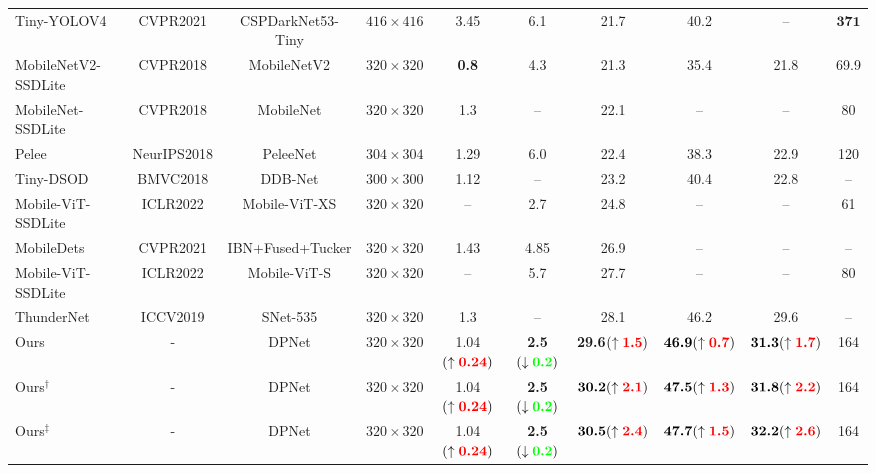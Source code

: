 \documentclass[lettersize,journal]{IEEEtran}
\begin{document}
\begin{table*}[t!]
\begin{center}
\begin{tabular}{l|c|c|c|c|c|c|c|c|c}
Tiny-YOLOV4 \cite{wang2021scaled} &CVPR2021& CSPDarkNet53-Tiny &$416\times416$&3.45 & 6.1 &21.7&40.2&--& $\textbf{371}$\\ 		
			MobileNetV2-SSDLite \cite{sandler2018mobilenetv2}  &CVPR2018 & MobileNetV2 &$320\times320$& \textbf{0.8} & 4.3 &21.3&35.4&21.8&69.9\\
			MobileNet-SSDLite \cite{sandler2018mobilenetv2}  &CVPR2018 & MobileNet &$320\times320$& 1.3 & -- &22.1&--&--&80\\
			Pelee \cite{Pelee} &NeurIPS2018 &PeleeNet&$304\times304$  &1.29 & 6.0 &22.4&38.3&22.9 &120\\
			Tiny-DSOD \cite{li2018tiny}&BMVC2018 &DDB-Net&$300\times300$  &1.12 & -- &23.2&40.4&22.8 & --\\
Mobile-ViT-SSDLite \cite{mehta2021mobilevit}&ICLR2022 &Mobile-ViT-XS &$320\times320$ &--&2.7 &24.8&--&--&61\\
			MobileDets \cite{xiong2021mobiledets}&CVPR2021 & IBN+Fused+Tucker  &$320\times320$&1.43 & 4.85 &26.9&--&-- &-- \\
			Mobile-ViT-SSDLite \cite{mehta2021mobilevit}&ICLR2022	 &Mobile-ViT-S &$320\times320$  &--&5.7&27.7&--&--&80\\
			ThunderNet \cite{qin2019thundernet}&ICCV2019&SNet-535&$320\times320$&1.3 & -- &28.1 &46.2&29.6 & --\\			
\midrule
			Ours &- &DPNet&$320\times320$&1.04$(\uparrow\textcolor{red}{\textbf{0.24}})$ & \textbf{2.5}$(\downarrow\textcolor{green}{\textbf{0.2}})$ &  \textbf{29.6}$(\uparrow\textcolor{red}{\textbf{1.5}})$ &$\textbf{46.9}(\uparrow\textcolor{red}{\textbf{0.7}})$  &$\textbf{31.3}(\uparrow\textcolor{red}{\textbf{1.7}})$ & 164\\
			Ours$^{\dagger}$ &- &DPNet&$320\times320$&1.04$(\uparrow\textcolor{red}{\textbf{0.24}})$ & \textbf{2.5}$(\downarrow\textcolor{green}{\textbf{0.2}})$ &  $\textbf{30.2}(\uparrow\textcolor{red}{\textbf{2.1}})$ &$\textbf{47.5}(\uparrow\textcolor{red}{\textbf{1.3}})$  &$\textbf{31.8}(\uparrow\textcolor{red}{\textbf{2.2}})$ & 164\\
			Ours$^{\ddagger}$ &- &DPNet&$320\times320$&1.04$(\uparrow\textcolor{red}{\textbf{0.24}})$ & \textbf{2.5}$(\downarrow\textcolor{green}{\textbf{0.2}})$ &  $\textbf{30.5}(\uparrow\textcolor{red}{\textbf{2.4}})$ &$\textbf{47.7}(\uparrow\textcolor{red}{\textbf{1.5}})$  &$\textbf{32.2}(\uparrow\textcolor{red}{\textbf{2.6}})$ & 164\\
\bottomrule
	\end{tabular}
	\end{center}\label{tab:det_result}
\end{table*}
\end{document}
